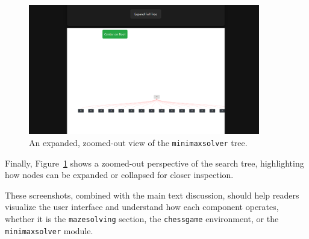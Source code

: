 \documentclass[12pt,a4paper]{article}
\begin{document}
\FloatBarrier
\begin{figure}[htbp]
  \centering
  \includegraphics[width=0.9\textwidth]{figures/treefinal.png}
  \caption{An expanded, zoomed-out view of the \texttt{minimaxsolver} tree.}
  \label{fig:minimaxtreefinal}
\end{figure}

\noindent
Finally, Figure~\ref{fig:minimaxtreefinal} shows a zoomed-out perspective of the 
search tree, highlighting how nodes can be expanded or collapsed for closer inspection.

\FloatBarrier

\noindent
These screenshots, combined with the main text discussion, should help readers 
visualize the user interface and understand how each component operates, 
whether it is the \texttt{mazesolving} section, the \texttt{chessgame} environment, 
or the \texttt{minimaxsolver} module.
\end{document}
